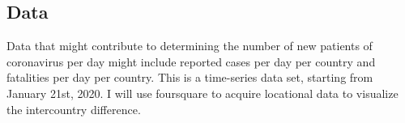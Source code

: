\subsection{Data}
Data that might contribute to determining the number of new patients of coronavirus per day might include reported cases per day per country and fatalities per day per country. This is a time-series data set, starting from January 21st, 2020. I will use foursquare to acquire locational data to visualize the intercountry difference.
